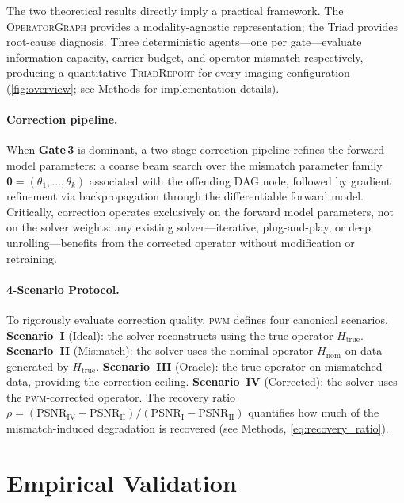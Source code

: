 \documentclass[11pt]{article}
\newcommand{\pwm}{\textsc{pwm}}
\newcommand{\opg}{\textsc{OperatorGraph}}
\newcommand{\Hnom}{H_{\mathrm{nom}}}
\newcommand{\Htrue}{H_{\mathrm{true}}}
\newcommand{\psnr}{\mathrm{PSNR}}
\newcommand{\recoveryratio}{\rho}
\newcommand{\mismatchparam}{\boldsymbol{\theta}}
\newcommand{\triadreport}{\textsc{Triad\-Report}}
\newcommand{\gatethree}{\textbf{Gate\,3}}
\begin{document}
\begin{sloppypar}
The two theoretical results directly imply a practical framework. The \opg{} provides a modality-agnostic representation; the Triad provides root-cause diagnosis. Three deterministic agents---one per gate---evaluate information capacity, carrier budget, and operator mismatch respectively, producing a quantitative \triadreport{} for every imaging configuration (\cref{fig:overview}; see Methods for implementation details).
\end{sloppypar}

\paragraph{Correction pipeline.}
When \gatethree{} is dominant, a two-stage correction pipeline refines the forward model parameters: a coarse beam search over the mismatch parameter family $\mismatchparam = (\theta_1, \ldots, \theta_k)$ associated with the offending DAG node, followed by gradient refinement via backpropagation through the differentiable forward model. Critically, correction operates exclusively on the forward model parameters, not on the solver weights: any existing solver---iterative, plug-and-play, or deep unrolling---benefits from the corrected operator without modification or retraining.

\paragraph{4-Scenario Protocol.}
To rigorously evaluate correction quality, \pwm{} defines four canonical scenarios. \textbf{Scenario~I} (Ideal): the solver reconstructs using the true operator $\Htrue$. \textbf{Scenario~II} (Mismatch): the solver uses the nominal operator $\Hnom$ on data generated by $\Htrue$. \textbf{Scenario~III} (Oracle): the true operator on mismatched data, providing the correction ceiling. \textbf{Scenario~IV} (Corrected): the solver uses the \pwm{}-corrected operator. The recovery ratio $\recoveryratio = (\psnr_{\mathrm{IV}} - \psnr_{\mathrm{II}}) / (\psnr_{\mathrm{I}} - \psnr_{\mathrm{II}})$ quantifies how much of the mismatch-induced degradation is recovered (see Methods, \cref{eq:recovery_ratio}).

\FloatBarrier
\section*{Empirical Validation}
\end{document}
